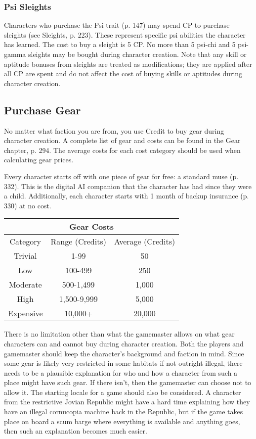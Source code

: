 \subsubsection{Psi Sleights}
Characters who purchase the Psi trait (p. 147) may spend CP to purchase
sleights (see Sleights, p. 223).  These represent specific psi abilities the
character has learned. The cost to buy a sleight is 5 CP. No more than 5
psi-chi and 5 psi-gamma sleights may be bought during character creation.  Note
that any skill or aptitude bonuses from sleights are treated as modifications;
they are applied after all CP are spent and do not affect the cost of buying
skills or aptitudes during character creation.

\subsection{Purchase Gear}

No matter what faction you are from, you use Credit to buy gear during
character creation. A complete list of gear and costs can be found in the Gear
chapter, p.  294. The average costs for each cost category should be used when
calculating gear prices.
                
Every character starts off with one piece of gear for free: a standard muse
(p. 332). This is the digital AI companion that the character has had since
they were a child. Additionally, each character starts with 1 month of backup
insurance (p. 330) at no cost.

\begin{center}
  \begin{tabular}{|c|c|c|}
    \hline
    \multicolumn{3}{|c|}{Gear Costs} \\
    \hline
    Category & Range (Credits) & Average (Credits)\\ 
    \hline
    Trivial & 1-99 & 50\\ 
    \hline
    Low & 100-499 & 250\\ 
    \hline
    Moderate & 500-1,499 & 1,000\\ 
    \hline
    High & 1,500-9,999 & 5,000\\ 
    \hline
    Expensive & 10,000+ & 20,000\\ 
    \hline
  \end{tabular}
\end{center}

There is no limitation other than what the gamemaster allows on what gear
characters can and cannot buy during character creation. Both the players and
gamemaster should keep the character’s background and faction in mind. Since
some gear is likely very restricted in some habitats if not outright illegal,
there needs to be a plausible explanation for who and how a character from such
a place might have such gear.  If there isn’t, then the gamemaster can choose
not to allow it. The starting locale for a game should also be considered. A
character from the restrictive Jovian Republic might have a hard time
explaining how they have an illegal cornucopia machine back in the Republic,
but if the game takes place on board a scum barge where everything is available
and anything goes, then such an explanation becomes much easier.

